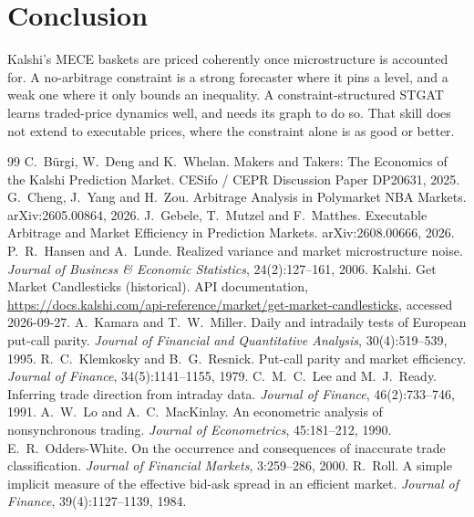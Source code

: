 \documentclass[11pt,a4paper]{article}
\begin{document}
\section{Conclusion}
Kalshi's MECE baskets are priced coherently once microstructure is accounted for.
A no-arbitrage constraint is a strong forecaster where it pins a level, and a weak
one where it only bounds an inequality. A constraint-structured STGAT learns
traded-price dynamics well, and needs its graph to do so. That skill does not
extend to executable prices, where the constraint alone is as good or better.

\begin{thebibliography}{99}
 C.~B\"urgi, W.~Deng and K.~Whelan. Makers and Takers: The Economics of the Kalshi Prediction Market. CESifo / CEPR Discussion Paper DP20631, 2025.
 G.~Cheng, J.~Yang and H.~Zou. Arbitrage Analysis in Polymarket NBA Markets. arXiv:2605.00864, 2026.
 J.~Gebele, T.~Mutzel and F.~Matthes. Executable Arbitrage and Market Efficiency in Prediction Markets. arXiv:2608.00666, 2026.
 P.~R.~Hansen and A.~Lunde. Realized variance and market microstructure noise. \emph{Journal of Business \& Economic Statistics}, 24(2):127--161, 2006.
 Kalshi. Get Market Candlesticks (historical). API documentation, \url{https://docs.kalshi.com/api-reference/market/get-market-candlesticks}, accessed 2026-09-27.
 A.~Kamara and T.~W.~Miller. Daily and intradaily tests of European put-call parity. \emph{Journal of Financial and Quantitative Analysis}, 30(4):519--539, 1995.
 R.~C.~Klemkosky and B.~G.~Resnick. Put-call parity and market efficiency. \emph{Journal of Finance}, 34(5):1141--1155, 1979.
 C.~M.~C.~Lee and M.~J.~Ready. Inferring trade direction from intraday data. \emph{Journal of Finance}, 46(2):733--746, 1991.
 A.~W.~Lo and A.~C.~MacKinlay. An econometric analysis of nonsynchronous trading. \emph{Journal of Econometrics}, 45:181--212, 1990.
 E.~R.~Odders-White. On the occurrence and consequences of inaccurate trade classification. \emph{Journal of Financial Markets}, 3:259--286, 2000.
 R.~Roll. A simple implicit measure of the effective bid-ask spread in an efficient market. \emph{Journal of Finance}, 39(4):1127--1139, 1984.

\end{thebibliography}
\end{document}
